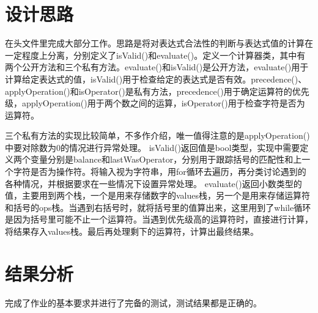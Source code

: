 \documentclass[UTF8]{ctexart}
\begin{document}
\pagestyle{fancy}
\fancyhead{}

\section{设计思路}

在头文件里完成大部分工作。思路是将对表达式合法性的判断与表达式值的计算在一定程度上分离，分别定义了isValid()和evaluate()。定义一个计算器类，其中有两个公开方法和三个私有方法。evaluate()和isValid()是公开方法，evaluate()用于计算给定表达式的值，isValid()用于检查给定的表达式是否有效。precedence()、applyOperation()和isOperator()是私有方法，precedence()用于确定运算符的优先级，applyOperation()用于两个数之间的运算，isOperator()用于检查字符是否为运算符。

三个私有方法的实现比较简单，不多作介绍，唯一值得注意的是applyOperation()中要对除数为0的情况进行异常处理。
isValid()返回值是bool类型，实现中需要定义两个变量分别是balance和lastWasOperator，分别用于跟踪括号的匹配性和上一个字符是否为操作符。将输入视为字符串，用for循环去遍历，再分类讨论遇到的各种情况，并根据要求在一些情况下设置异常处理。
evaluate()返回小数类型的值，主要用到两个栈，一个是用来存储数字的values栈，另一个是用来存储运算符和括号的ops栈。当遇到右括号时，就将括号里的值算出来，这里用到了while循环是因为括号里可能不止一个运算符。当遇到优先级高的运算符时，直接进行计算，将结果存入values栈。最后再处理剩下的运算符，计算出最终结果。

\section{结果分析}

完成了作业的基本要求并进行了完备的测试，测试结果都是正确的。
\end{document}
